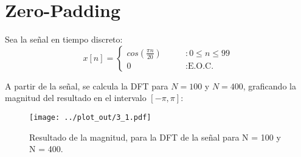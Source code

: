 \section{Zero-Padding}
	Sea la señal en tiempo discreto:
	\begin{equation}
				x[n] = \begin{cases}
							cos\left( \frac{\pi n}{20} \right)  & \qquad : 0 \leq n \leq 99 \\
							0  & \qquad : \text{E.O.C.}
						\end{cases}
	\end{equation}
	
	A partir de la señal, se calcula la DFT para $N = 100$ y $N = 400$, graficando la magnitud del resultado en el intervalo $\left[ -\pi , \pi \right]$:
	\begin{figure}[H]
		\center
		\texttt{[image: ../plot\_out/3\_1.pdf]}
		\caption{Resultado de la magnitud, para la DFT de la señal para N = 100 y N = 400. }
		\label{fig:3_1_mag_plot}
	\end{figure}
				